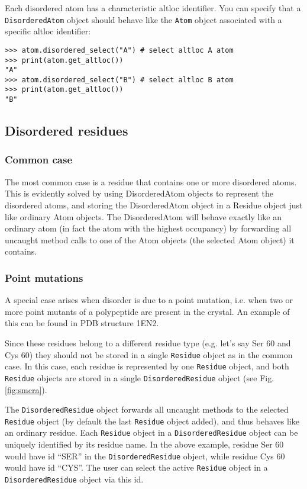 Each disordered atom has a characteristic altloc identifier. You can
specify that a \texttt{Disordered\-Atom} object should behave like
the \texttt{Atom} object associated with a specific altloc identifier:

\begin{verbatim}
>>> atom.disordered_select("A") # select altloc A atom
>>> print(atom.get_altloc())
"A"
>>> atom.disordered_select("B") # select altloc B atom
>>> print(atom.get_altloc())
"B"
\end{verbatim}

\subsection{Disordered residues}

\subsubsection*{Common case}

The most common case is a residue that contains one or more disordered atoms.
This is evidently solved by using DisorderedAtom objects to represent the disordered
atoms, and storing the DisorderedAtom object in a Residue object just like ordinary
Atom objects. The DisorderedAtom will behave exactly like an ordinary atom (in
fact the atom with the highest occupancy) by forwarding all uncaught method
calls to one of the Atom objects (the selected Atom object) it contains.

\subsubsection*{Point mutations}
\label{sec:point_mutations}

A special case arises when disorder is due to a point mutation, i.e. when two
or more point mutants of a polypeptide are present in the crystal. An example
of this can be found in PDB structure 1EN2.

Since these residues belong to a different residue type (e.g. let's
say Ser 60 and Cys 60) they should not be stored in a single \texttt{Residue}
object as in the common case. In this case, each residue is represented
by one \texttt{Residue} object, and both \texttt{Residue} objects
are stored in a single \texttt{Disordered\-Residue} object (see Fig.
\ref{fig:smcra}).

The \texttt{Dis\-ordered\-Residue} object forwards all un\-caught methods to
the selected \texttt{Residue} object (by default the last \texttt{Residue}
object added), and thus behaves like an ordinary residue. Each
\texttt{Residue} object in a \texttt{Disordered\-Residue} object can be
uniquely identified by its residue name. In the above example, residue Ser 60
would have id ``SER'' in the \texttt{Disordered\-Residue} object, while
residue Cys 60 would have id ``CYS''. The user can select the active
\texttt{Residue} object in a \texttt{Disordered\-Residue} object via this id.

